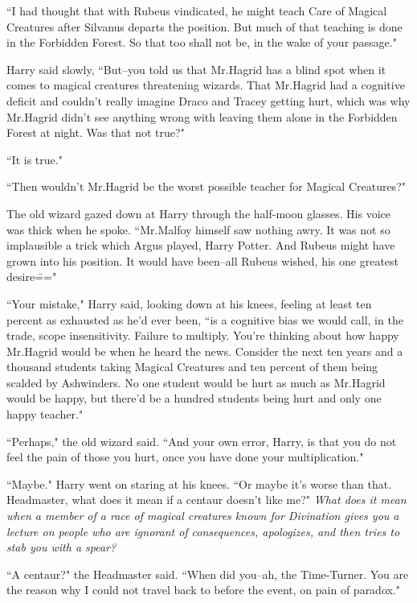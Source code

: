 ``I had thought that with Rubeus vindicated, he might teach Care of Magical Creatures after Silvanus departs the position. But much of that teaching is done in the Forbidden Forest. So that too shall not be, in the wake of your passage."

Harry said slowly, ``But\---you told us that Mr.\?Hagrid has a blind spot when it comes to magical creatures threatening wizards. That Mr.\?Hagrid had a cognitive deficit and couldn't really imagine Draco and Tracey getting hurt, which was why Mr.\?Hagrid didn't see anything wrong with leaving them alone in the Forbidden Forest at night. Was that not true?"

``It is true."

``Then wouldn't Mr.\?Hagrid be the worst possible teacher for Magical Creatures?"

The old wizard gazed down at Harry through the half-moon glasses. His voice was thick when he spoke. ``Mr.\?Malfoy himself saw nothing awry. It was not so implausible a trick which Argus played, Harry Potter. And Rubeus might have grown into his position. It would have been\---all Rubeus wished, his one greatest desire\==="

``Your mistake," Harry said, looking down at his knees, feeling at least ten percent as exhausted as he'd ever been, ``is a cognitive bias we would call, in the trade, scope insensitivity. Failure to multiply. You're thinking about how happy Mr.\?Hagrid would be when he heard the news. Consider the next ten years and a thousand students taking Magical Creatures and ten percent of them being scalded by Ashwinders. No one student would be hurt as much as Mr.\?Hagrid would be happy, but there'd be a hundred students being hurt and only one happy teacher."

``Perhaps," the old wizard said. ``And your own error, Harry, is that you do not feel the pain of those you hurt, once you have done your multiplication."

``Maybe." Harry went on staring at his knees. ``Or maybe it's worse than that. Headmaster, what does it mean if a centaur doesn't like me?" \emph{What does it mean when a member of a race of magical creatures known for Divination gives you a lecture on people who are ignorant of consequences, apologizes, and then tries to stab you with a spear?}

``A centaur?" the Headmaster said. ``When did you\---ah, the Time-Turner. You are the reason why I could not travel back to before the event, on pain of paradox."

